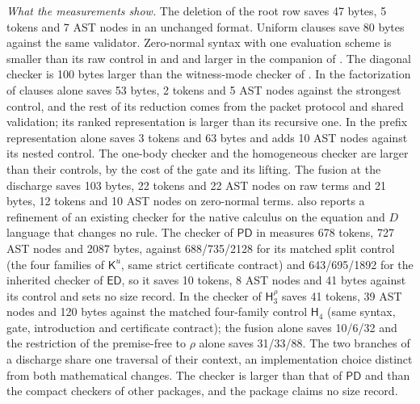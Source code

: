 \emph{What the measurements show.} The deletion of the root row saves 47
bytes, 5 tokens and 7 AST nodes in an unchanged format. Uniform clauses
save 80 bytes against the same validator. Zero-normal syntax with one
evaluation scheme is smaller than its raw control in
 and  and larger
in the companion of . The diagonal checker
is 100 bytes larger than the witness-mode checker of
. In  the factorization of
clauses alone saves 53 bytes, 2 tokens and 5 AST nodes against the
strongest control, and the rest of its reduction comes from the packet
protocol and shared validation; its ranked representation is larger than
its recursive one. In  the prefix representation
alone saves 3 tokens and 63 bytes and adds 10 AST nodes against its
nested control. The one-body checker and the homogeneous checker are
larger than their controls, by the cost of the gate and its lifting. The
fusion at the discharge saves 103 bytes, 22 tokens and 22 AST nodes on raw
terms and 21 bytes, 12 tokens and 10 AST nodes on zero-normal terms.
 also reports a refinement of an existing checker for the
native calculus on the equation and $D$ language that changes no rule.
The checker of $\mathsf{PD}$ in  measures
678 tokens, 727 AST nodes and 2087 bytes, against 688/735/2128 for its
matched split control (the four families of $\mathsf{K}^{u}$, same strict
certificate contract) and 643/695/1892 for the inherited checker of
$\mathsf{ED}$, so it saves 10 tokens, 8 AST nodes and 41 bytes against its
control and sets no size record. In  the
checker of $\mathsf{H}_3^{\rho}$ saves 41 tokens, 39 AST nodes and 120
bytes against the matched four-family control $\mathsf{H}_4$ (same
syntax, gate, introduction and certificate contract); the fusion alone
saves 10/6/32 and the restriction of the premise-free  to
$\rho$ alone saves 31/33/88. The two branches of a discharge share one
traversal of their context, an implementation choice distinct from both
mathematical changes. The checker is larger than that of $\mathsf{PD}$ and
than the compact checkers of other packages, and the package claims no
size record.

